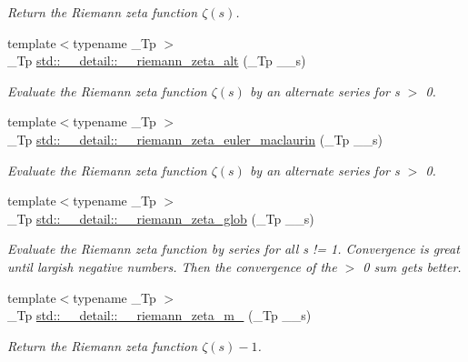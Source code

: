 \begin{DoxyCompactItemize}
\begin{DoxyCompactList}\small\item\em Return the Riemann zeta function $ \zeta(s) $. \end{DoxyCompactList}\item 
{\footnotesize template$<$typename \+\_\+\+Tp $>$ }\\\+\_\+\+Tp \hyperlink{namespacestd_1_1____detail_a4b3f83cafed65af679eedcf37fefff00}{std\+::\+\_\+\+\_\+detail\+::\+\_\+\+\_\+riemann\+\_\+zeta\+\_\+alt} (\+\_\+\+Tp \+\_\+\+\_\+s)
\begin{DoxyCompactList}\small\item\em Evaluate the Riemann zeta function $ \zeta(s) $ by an alternate series for s $>$ 0. \end{DoxyCompactList}\item 
{\footnotesize template$<$typename \+\_\+\+Tp $>$ }\\\+\_\+\+Tp \hyperlink{namespacestd_1_1____detail_a84ac805996c4eeb8cbfa181e6e47f0ae}{std\+::\+\_\+\+\_\+detail\+::\+\_\+\+\_\+riemann\+\_\+zeta\+\_\+euler\+\_\+maclaurin} (\+\_\+\+Tp \+\_\+\+\_\+s)
\begin{DoxyCompactList}\small\item\em Evaluate the Riemann zeta function $ \zeta(s) $ by an alternate series for s $>$ 0. \end{DoxyCompactList}\item 
{\footnotesize template$<$typename \+\_\+\+Tp $>$ }\\\+\_\+\+Tp \hyperlink{namespacestd_1_1____detail_ab3542ea44b34da3d4865ed9a014e2951}{std\+::\+\_\+\+\_\+detail\+::\+\_\+\+\_\+riemann\+\_\+zeta\+\_\+glob} (\+\_\+\+Tp \+\_\+\+\_\+s)
\begin{DoxyCompactList}\small\item\em Evaluate the Riemann zeta function by series for all s != 1. Convergence is great until largish negative numbers. Then the convergence of the $>$ 0 sum gets better. \end{DoxyCompactList}\item 
{\footnotesize template$<$typename \+\_\+\+Tp $>$ }\\\+\_\+\+Tp \hyperlink{namespacestd_1_1____detail_a174bfa28eeb176b90ff251b5affbecb2}{std\+::\+\_\+\+\_\+detail\+::\+\_\+\+\_\+riemann\+\_\+zeta\+\_\+m\+\_} (\+\_\+\+Tp \+\_\+\+\_\+s)
\begin{DoxyCompactList}\small\item\em Return the Riemann zeta function $ \zeta(s) - 1 $. \end{DoxyCompactList}\item 

\end{DoxyCompactItemize}
